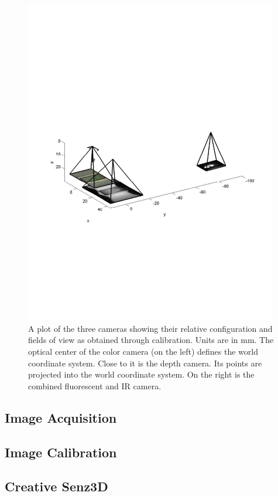 

\begin{figure}
  \includegraphics[width=11cm,trim=20 240 20 300,clip]{Figures/CameraConfiguration}
\caption{A plot of the three cameras showing their relative configuration and fields of view as obtained through calibration.  Units are in mm.  The optical center of the color camera (on the left) defines the world coordinate system.  Close to it is the depth camera.  Its points are projected into the world coordinate system.  On the right is the combined fluorescent and IR camera.}
\label{fig:CameraConfiguration}
\end{figure}

\subsection{Image Acquisition}

\subsection{Image Calibration}

\subsection{Creative Senz3D}

